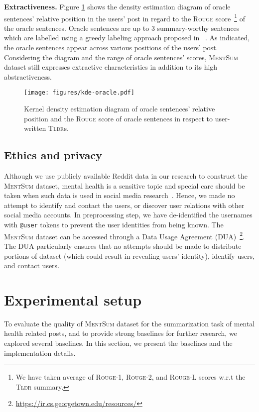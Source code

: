 \documentclass[10pt, a4paper]{article}
\newcommand{\tldr}{\textsc{Tldr}}
\newcommand{\mentsum}{\textsc{MentSum}}
\begin{document}
\textbf{Extractiveness.} Figure \ref{fig:ext} shows the density estimation diagram of oracle sentences' relative position in the users' post in regard to the \textsc{Rouge} score~\footnote{We have taken average of \textsc{Rouge-1}, \textsc{Rouge-2}, and \textsc{Rouge-L} scores w.r.t the \tldr{} summary.} of the oracle sentences. Oracle sentences are up to 3 summary-worthy sentences which are labelled using a greedy labeling approach proposed in ~. As indicated, the oracle sentences appear across various positions of the users' post. Considering the diagram and the range of oracle sentences' scores, \mentsum{} dataset still expresses extractive characteristics in addition to its high abstractiveness.  

\begin{figure}
    \centering
    \texttt{[image: figures/kde-oracle.pdf]}
    \caption{Kernel density estimation diagram of oracle sentences' relative position and the \textsc{Rouge} score of oracle sentences in respect to user-written \tldr s. }
    \label{fig:ext}
\end{figure}


\subsection{Ethics and privacy}
 Although we use publicly available Reddit data in our research to construct the \mentsum{} dataset, mental health is a sensitive topic and special care should be taken when such data is used in social media research~\cite{Thomas2002ACO,Moreno2013EthicsOS,Suster2017ASR,Benton2017EthicalRP,Nicholas2020EthicsAP}. Hence, we made no attempt to identify and contact the users, or discover user relations with other social media accounts. In preprocessing step, we have de-identified the usernames with \texttt{@user} tokens to prevent the user identities from being known. The \mentsum{} dataset can be accessed through a Data Usage
Agreement (DUA)~\footnote{\url{https://ir.cs.georgetown.edu/resources/}}. The DUA particularly ensures that no attempts should be made to distribute portions of dataset (which could result in revealing users' identity), identify users, and contact users. 


\section{Experimental setup}
To evaluate the quality of \mentsum{} dataset for the summarization task of mental health related posts, and to provide strong baselines for further research, we explored several baselines. In this section, we present the baselines and the implementation details. 
\end{document}
